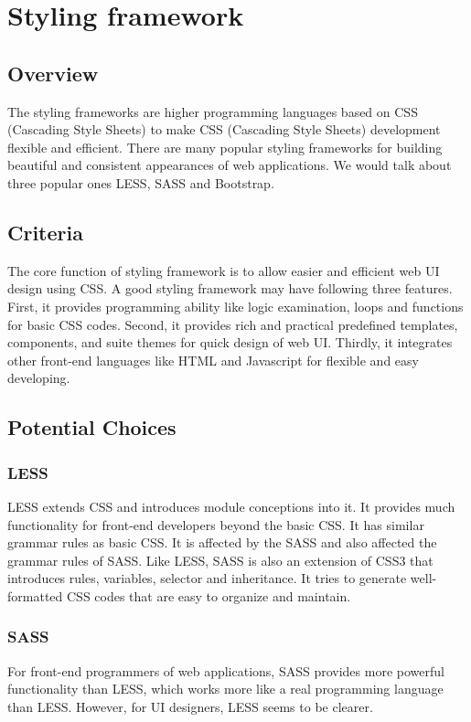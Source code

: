 \documentclass[letterpaper,10pt]{article}
\begin{document}
\section{Styling framework}
	\subsection{Overview}
  The styling frameworks are higher programming languages based on CSS (Cascading Style Sheets) to make CSS (Cascading Style Sheets) development flexible and efficient. There are many popular styling frameworks for building beautiful and consistent appearances of web applications. We would talk about three popular ones LESS, SASS and Bootstrap.

	\subsection{Criteria}
  The core function of styling framework is to allow easier and efficient web UI design using CSS. A good styling framework may have following three features. First, it provides programming ability like logic examination, loops and functions for basic CSS codes. Second, it provides rich and practical predefined templates, components, and suite themes for quick design of web UI. Thirdly, it integrates other front-end languages like HTML and Javascript for flexible and easy developing.

	\subsection{Potential Choices}
		\subsubsection{LESS}
        LESS extends CSS and introduces module conceptions into it. It provides much functionality for front-end developers beyond the basic CSS. It has similar grammar rules as basic CSS. It is affected by the SASS and also affected the grammar rules of SASS. Like LESS, SASS is also an extension of CSS3 that introduces rules, variables, selector and inheritance. It tries to generate well-formatted CSS codes that are easy to organize and maintain.

		\subsubsection{SASS}
        For front-end programmers of web applications, SASS provides more powerful functionality than LESS, which works more like a real programming language than LESS. However, for UI designers, LESS seems to be clearer.
\end{document}
